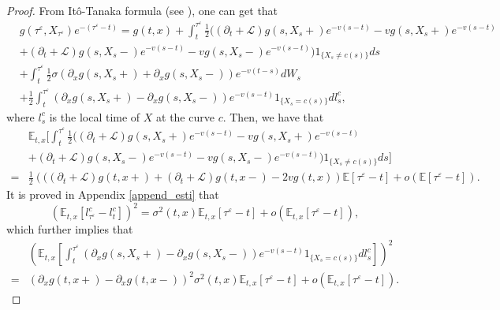 \documentclass[11pt]{article}
\begin{document}
\begin{proof}
From It\^o-Tanaka formula (see \cite{peskir2006optimal}), one can get that 
\begin{equation*}
\begin{split}
&g(\tau^{\varepsilon},X_{\tau^{\varepsilon}})e^{-(\tau^{\varepsilon}-t)}=g(t,x)+\int_t^{\tau^{\varepsilon}}\frac12\bigg( (\partial_t+\mathcal L)g(s,X_s+)e^{-v(s-t)}-vg(s,X_s+)e^{-v(s-t)}\\
&+(\partial_t+\mathcal L)g(s,X_s-)e^{-v(s-t)}-vg(s,X_s-)e^{-v(s-t)}\bigg)1_{\{X_s \neq c(s)\}}ds\\
&+\int_t^{\tau^{\varepsilon}}\frac12 \sigma( \partial_x g(s,X_s+)+ \partial_x g(s,X_s-))e^{-v(t-s)}dW_s\\
&+\frac{1}{2} \int_t^{\tau^{\varepsilon}}(\partial_x g(s,X_s+)-\partial_x g(s,X_s-))e^{-v(s-t)}1_{\{X_s=c(s)\}}dl^c_s, 
\end{split}
\end{equation*}
where $l^c_s$ is the local time of $X$ at the curve $c$. Then, we have that  
\begin{equation*}
\begin{split}
&\mathbb E_{t,x}\bigg[\int_t^{\tau^{\varepsilon}}\frac12\bigg( (\partial_t+\mathcal L)g(s,X_s+)e^{-v(s-t)}-vg(s,X_s+)e^{-v(s-t)}\\
&+(\partial_t+\mathcal L)g(s,X_s-)e^{-v(s-t)}-vg(s,X_s-)e^{-v(s-t)}\bigg)1_{\{X_s \neq c(s)\}}ds\bigg]\\
=&\frac{1}{2}\left(((\partial_t+\mathcal L)g(t,x+)+(\partial_t+\mathcal L)g(t,x-)-2vg(t,x)\right)\mathbb E[\tau^{\varepsilon}-t]+o(\mathbb E[\tau^{\varepsilon}-t]).
\end{split}
\end{equation*}
It is proved in Appendix \ref{append_esti} that
\begin{equation}\label{esti_square_of_local_time}
\left(\mathbb E_{t,x}[l^c_{\tau^{\varepsilon}}-l_t^c]\right)^2=\sigma^2(t,x)\mathbb E_{t,x}[\tau^{\varepsilon}-t]+o(\mathbb E_{t,x}[\tau^{\varepsilon}-t]),
\end{equation}
which further  implies that 
\begin{equation}
\begin{split}
&\left( \mathbb E_{t,x}[\int_t^{\tau^{\varepsilon}}(\partial_x g(s,X_s+)-\partial_x g(s,X_s-))e^{-v(s-t)}1_{\{X_s=c(s)\}}dl^c_s] \right)^2\\
=&\left( \partial_x g(t,x+)-\partial_x g(t,x-)\right)^2\sigma^2(t,x)\mathbb E_{t,x}[\tau^{\varepsilon}-t]+o(\mathbb E_{t,x}[\tau^{\varepsilon}-t]).
\end{split}

\end{equation}
\end{proof}
\end{document}
